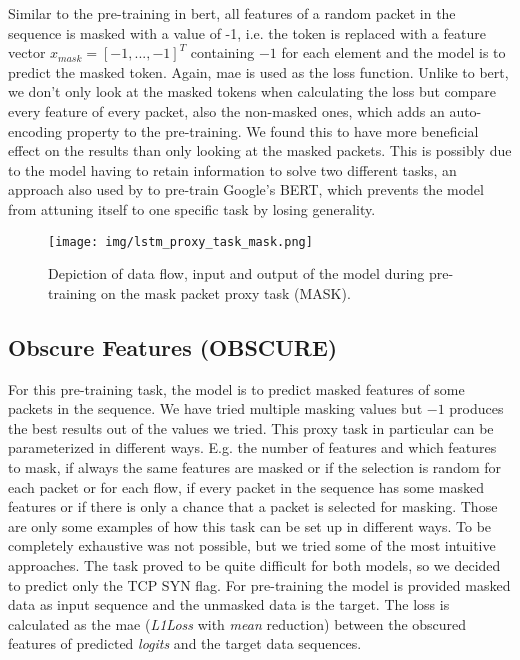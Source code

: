 Similar to the pre-training in \gls{bert}, all features of a random packet in the sequence is masked with a value of -1, i.e. the token is replaced with a feature vector $x_{mask} = [-1, ..., -1]^T$ containing $-1$ for each element and the model is to predict the masked token. Again, \gls{mae} is used as the loss function. Unlike to \gls{bert}, we don't only look at the masked tokens when calculating the loss but compare every feature of every packet, also the non-masked ones, which adds an auto-encoding property to the pre-training. We found this to have more beneficial effect on the results than only looking at the masked packets. This is possibly due to the model having to retain information to solve two different tasks, an approach also used by to pre-train Google's BERT,  which prevents the model from attuning itself to one specific task by losing generality.

\begin{figure}[h]
	\centering
	\texttt{[image: img/lstm\_proxy\_task\_mask.png]}
	\caption{Depiction of data flow, input and output of the model during pre-training on the mask packet proxy task (MASK).}
	\label{fig:experiments:lstm_proxy_task_mask}
\end{figure}

\subsection{Obscure Features (OBSCURE)} \label{sec:experiments:lstm:obscure}

For this pre-training task, the model is to predict masked features of some packets in the sequence. We have tried multiple masking values but $-1$ produces the best results out of the values we tried. This proxy task in particular can be parameterized in different ways. E.g. the number of features and which features to mask, if always the same features are masked or if the selection is random for each packet or for each flow, if every packet in the sequence has some masked features or if there is only a chance that a packet is selected for masking. Those are only some examples of how this task can be set up in different ways. To be completely exhaustive was not possible, but we tried some of the most intuitive approaches. The task proved to be quite difficult for both models, so we decided to predict only the TCP SYN flag. For pre-training the model is provided masked data as input sequence and the unmasked data is the target. The loss is calculated as the \gls{mae} (\textit{L1Loss} with \textit{mean} reduction) between the obscured features of predicted \textit{logits} and the target data sequences.

